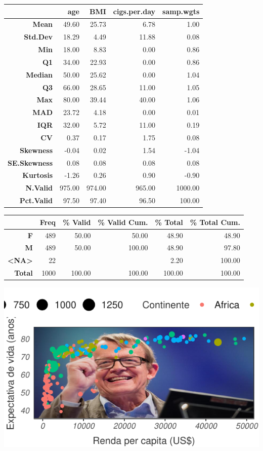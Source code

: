 \documentclass[]{tufte-book}
\begin{document}
\begin{longtable}[]{@{}rrrrr@{}}
\toprule
~ & age & BMI & cigs.per.day & samp.wgts\tabularnewline
\midrule
\endhead
\textbf{Mean} & 49.60 & 25.73 & 6.78 & 1.00\tabularnewline
\textbf{Std.Dev} & 18.29 & 4.49 & 11.88 & 0.08\tabularnewline
\textbf{Min} & 18.00 & 8.83 & 0.00 & 0.86\tabularnewline
\textbf{Q1} & 34.00 & 22.93 & 0.00 & 0.86\tabularnewline
\textbf{Median} & 50.00 & 25.62 & 0.00 & 1.04\tabularnewline
\textbf{Q3} & 66.00 & 28.65 & 11.00 & 1.05\tabularnewline
\textbf{Max} & 80.00 & 39.44 & 40.00 & 1.06\tabularnewline
\textbf{MAD} & 23.72 & 4.18 & 0.00 & 0.01\tabularnewline
\textbf{IQR} & 32.00 & 5.72 & 11.00 & 0.19\tabularnewline
\textbf{CV} & 0.37 & 0.17 & 1.75 & 0.08\tabularnewline
\textbf{Skewness} & -0.04 & 0.02 & 1.54 & -1.04\tabularnewline
\textbf{SE.Skewness} & 0.08 & 0.08 & 0.08 & 0.08\tabularnewline
\textbf{Kurtosis} & -1.26 & 0.26 & 0.90 & -0.90\tabularnewline
\textbf{N.Valid} & 975.00 & 974.00 & 965.00 & 1000.00\tabularnewline
\textbf{Pct.Valid} & 97.50 & 97.40 & 96.50 & 100.00\tabularnewline
\bottomrule
\end{longtable}

\begin{longtable}[]{@{}rrrrrr@{}}
\toprule
~ & Freq & \% Valid & \% Valid Cum. & \% Total & \% Total
Cum.\tabularnewline
\midrule
\endhead
\textbf{F} & 489 & 50.00 & 50.00 & 48.90 & 48.90\tabularnewline
\textbf{M} & 489 & 50.00 & 100.00 & 48.90 & 97.80\tabularnewline
\textbf{\textless NA\textgreater{}} & 22 & & & 2.20 &
100.00\tabularnewline
\textbf{Total} & 1000 & 100.00 & 100.00 & 100.00 & 100.00\tabularnewline
\bottomrule
\end{longtable}

\begin{center}\includegraphics[width=0.95\linewidth]{conceitos_basicos_files/figure-latex/unnamed-chunk-8-1} \end{center}
\end{document}
